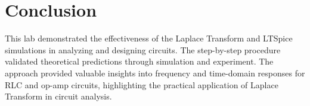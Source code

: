 \chapter{Conclusion}

This lab demonstrated the effectiveness of the Laplace Transform and LTSpice simulations in analyzing and designing circuits. The step-by-step procedure validated theoretical predictions through simulation and experiment. The approach provided valuable insights into frequency and time-domain responses for RLC and op-amp circuits, highlighting the practical application of Laplace Transform in circuit analysis.
